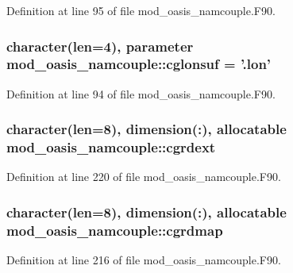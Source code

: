 Definition at line 95 of file mod\+\_\+oasis\+\_\+namcouple.\+F90.

\hypertarget{classmod__oasis__namcouple_ac1a557cecb41295e7d5cb004a7937ea4}{
\subsubsection[{cglonsuf}]{\setlength{\rightskip}{0pt plus 5cm}character(len=4), parameter mod\+\_\+oasis\+\_\+namcouple\+::cglonsuf = '.lon'\hspace{0.3cm}{\ttfamily [private]}}}\label{classmod__oasis__namcouple_ac1a557cecb41295e7d5cb004a7937ea4}


Definition at line 94 of file mod\+\_\+oasis\+\_\+namcouple.\+F90.

\hypertarget{classmod__oasis__namcouple_a5db101d0bffaf6fbd5ae10d1d0069108}{
\subsubsection[{cgrdext}]{\setlength{\rightskip}{0pt plus 5cm}character(len=8), dimension(\+:), allocatable mod\+\_\+oasis\+\_\+namcouple\+::cgrdext\hspace{0.3cm}{\ttfamily [private]}}}\label{classmod__oasis__namcouple_a5db101d0bffaf6fbd5ae10d1d0069108}


Definition at line 220 of file mod\+\_\+oasis\+\_\+namcouple.\+F90.

\hypertarget{classmod__oasis__namcouple_affa01947af89e5cdad5f33fba2a53d22}{
\subsubsection[{cgrdmap}]{\setlength{\rightskip}{0pt plus 5cm}character(len=8), dimension(\+:), allocatable mod\+\_\+oasis\+\_\+namcouple\+::cgrdmap\hspace{0.3cm}{\ttfamily [private]}}}\label{classmod__oasis__namcouple_affa01947af89e5cdad5f33fba2a53d22}


Definition at line 216 of file mod\+\_\+oasis\+\_\+namcouple.\+F90.

